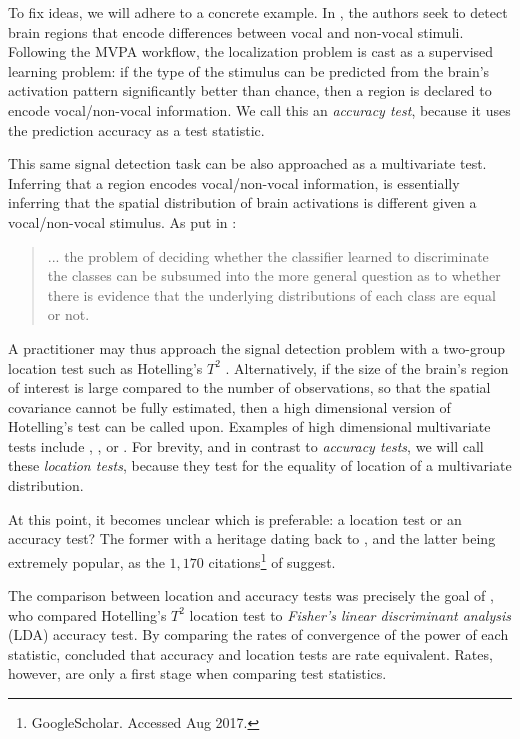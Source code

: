 \documentclass[12pt,a4paper]{article}
\begin{document}
To fix ideas, we will adhere to a concrete example.
In \cite{gilron_quantifying_2016}, the authors seek to detect brain regions that encode differences between vocal and non-vocal stimuli. 
Following the MVPA workflow, the localization problem is cast as a supervised learning problem: if the type of the stimulus can be predicted from the brain's activation pattern significantly better than chance, then a region is declared to encode vocal/non-vocal information. 
We call this an \emph{accuracy test}, because it uses the prediction accuracy as a test statistic. 

This same signal detection task can be also approached as a multivariate test.
Inferring that a region encodes vocal/non-vocal information, is essentially inferring that the spatial distribution of brain activations is different given a vocal/non-vocal stimulus. 
As put in \cite{pereira_machine_2009}: 
\begin{quote}
... the problem of deciding whether the classifier learned to discriminate the classes can be subsumed into the more general question as to whether there is evidence that the underlying distributions of each class are equal or not.
\end{quote}
A practitioner may thus approach the signal detection problem with a two-group location test such as Hotelling's $T^2$ \citep{anderson_introduction_2003}.
Alternatively, if the size of the brain's region of interest is large compared to the number of observations, so that the spatial covariance cannot be fully estimated, then a high dimensional version of Hotelling's test can be called upon.
Examples of high dimensional multivariate tests include \cite{schafer_shrinkage_2005}, \cite{goeman2006testing}, or \cite{srivastava_multivariate_2007} .
For brevity, and in contrast to \emph{accuracy tests}, we will call these \emph{location tests}, because they test for the equality of location of a multivariate distribution. 


At this point, it becomes unclear which is preferable: a location test or an accuracy test?
The former with a heritage dating back to \cite{hotelling_generalization_1931}, and the latter being extremely popular, as the $1,170$ citations\footnote{GoogleScholar. Accessed Aug 2017.} of \cite{kriegeskorte_information-based_2006} suggest. 

The comparison between location and accuracy tests was precisely the goal of \cite{ramdas_classification_2016}, who compared Hotelling's $T^2$ location test to \emph{Fisher's linear discriminant analysis} (LDA) accuracy test. 
By comparing the rates of convergence of the power of each statistic, \cite{ramdas_classification_2016} concluded that accuracy and location tests are rate equivalent. 
Rates, however, are only a first stage when comparing test statistics. 
\end{document}
